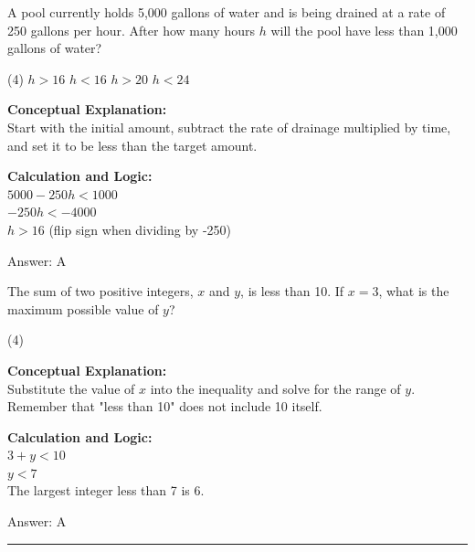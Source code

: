 \documentclass[11pt,paper=a4,answers]{exam}
\begin{document}
\begin{questions}
\vspace{20pt}

\question
A pool currently holds 5,000 gallons of water and is being drained at a rate of 250 gallons per hour. After how many hours $h$ will the pool have less than 1,000 gallons of water?
\begin{tasks}(4)
    \task $h > 16$
    \task $h < 16$
    \task $h > 20$
    \task $h < 24$
\end{tasks}

\begin{solution}
\textbf{Conceptual Explanation:} \\
Start with the initial amount, subtract the rate of drainage multiplied by time, and set it to be less than the target amount.

\vspace{10pt}
\textbf{Calculation and Logic:} \\
$5000 - 250h < 1000$ \\
$-250h < -4000$ \\
$h > 16$ (flip sign when dividing by -250)

\vspace{15pt}
Answer: \colorbox{yellow!100}{A}
\end{solution}

\vspace{20pt}

\question
The sum of two positive integers, $x$ and $y$, is less than 10. If $x = 3$, what is the maximum possible value of $y$?
\begin{tasks}(4)
\end{tasks}

\begin{solution}
\textbf{Conceptual Explanation:} \\
Substitute the value of $x$ into the inequality and solve for the range of $y$. Remember that "less than 10" does not include 10 itself.

\vspace{10pt}
\textbf{Calculation and Logic:} \\
$3 + y < 10$ \\
$y < 7$ \\
The largest integer less than 7 is 6.

\vspace{15pt}
Answer: \colorbox{yellow!100}{A}
\end{solution}


\end{questions}
\begin{center}
\rule{.5\textwidth}{1pt}
\end{center}
\end{document}
